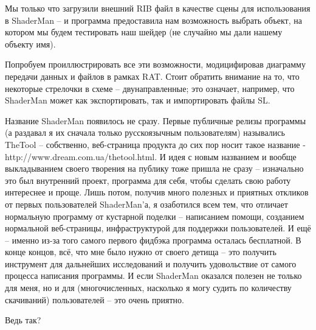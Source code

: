   

 Мы только что загрузили внешний RIB файл в качестве
    сцены для использования в ShaderMan – и программа предоставила нам
    возможность выбрать объект, на котором мы будем тестировать наш
    шейдер (не случайно мы дали нашему объекту имя).
  

 Попробуем проиллюстрировать все эти возможности,
    модицифировав диаграмму передачи данных и файлов в рамках RAT.
    Стоит обратить внимание на то, что некоторые стрелочки в схеме –
    двунаправленные; это означает, например, что ShaderMan может как
    экспортировать, так и импортировать файлы SL.
  

  

 Название ShaderMan появилось не сразу. Первые
    публичные релизы программы (а раздавал я их сначала только
    русскоязычным пользователям) назывались TheTool – собственно,
    веб-страница продукта до сих пор носит такое название -
    http://www.dream.com.ua/thetool.html. И идея с новым названием и
    вообще выкладыванием своего творения на публику тоже пришла не
    сразу – изначально это был внутренний проект, программа для себя,
    чтобы сделать свою работу интереснее и проще. Лишь потом, получив
    много полезных и приятных откликов от первых пользователей
    ShaderMan’а, я озаботился всем тем, что отличает нормальную
    программу от кустарной поделки – написанием помощи, созданием
    нормальной веб-страницы, инфраструктурой для поддержки
    пользователей. И ещё – именно из-за того самого первого фидбэка
    программа осталась бесплатной. В конце концов, всё, что мне было
    нужно от своего детища – это получить инструмент для дальнейших
    исследований и получить удовольствие от самого процесса написания
    программы. И если ShaderMan оказался полезен не только для меня, но
    и для (многочисленных, насколько я могу судить по количеству
    скачиваний) пользователей – это очень приятно.
  

 Ведь так?
